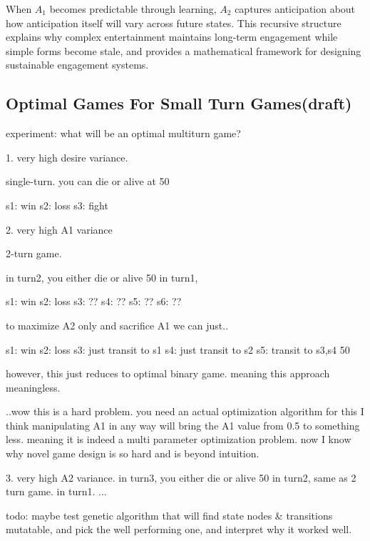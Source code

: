 \documentclass{article}
\begin{document}
When $A_1$ becomes predictable through learning, $A_2$ captures anticipation about how anticipation itself will vary across future states. This recursive structure explains why complex entertainment maintains long-term engagement while simple forms become stale, and provides a mathematical framework for designing sustainable engagement systems.

\subsection{Optimal Games For Small Turn Games(draft)}

experiment:
what will be an optimal multiturn game?

1. very high desire variance.

single-turn. you can die or alive at 50%

s1: win
s2: loss
s3: fight

2. very high A1 variance

2-turn game.

in turn2, you either die or alive 50%
in turn1, 

s1: win
s2: loss
s3: ??
s4: ??
s5: ??
s6: ??

to maximize A2 only and sacrifice A1 we can just..

s1: win
s2: loss
s3: just transit to s1
s4: just transit to s2
s5: transit to s3,s4 50%

however, this just reduces to optimal binary game. meaning this approach meaningless.

..wow this is a hard problem. you need an actual optimization algorithm for this I think
manipulating A1 in any way will bring the A1 value from 0.5 to something less. meaning it is indeed a multi parameter optimization problem. now I know why novel game design is so hard and is beyond intuition.

3. very high A2 variance.
in turn3, you either die or alive 50%
in turn2, same as 2 turn game.
in turn1. ...

todo: maybe test genetic algorithm that will find state nodes & transitions mutatable, and pick the well performing one, and interpret why it worked well.
\end{document}
